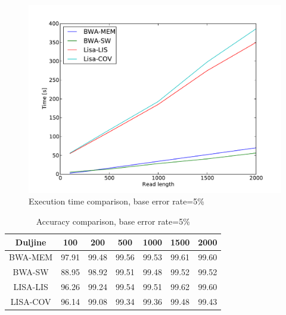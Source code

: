 \documentclass[times, utf8, diplomski]{fer}
\begin{document}
\begin{figure}[H]
\centering
\includegraphics[width=1.0\textwidth]{../img/chicken-e05-time.pdf}
\caption{Execution time comparison, base error rate=5\%}\label{chicken-e05-time}
\end{figure}

\begin{table}[H]
\centering
\begin{tabular}{|c||c|c|c|c|c|c|}
\hline
	Duljine & 100 & 200 & 500 & 1000 & 1500 & 2000\\
\hline
\hline
	BWA-MEM & 97.91 & 99.48 & 99.56 & 99.53 & 99.61 & 99.60\\
\hline
	BWA-SW  & 88.95 & 98.92 & 99.51 & 99.48 & 99.52 & 99.52\\
\hline
	LISA-LIS  & 96.26 & 99.24 & 99.54 & 99.51 & 99.62 & 99.60\\
\hline
	LISA-COV & 96.14 & 99.08 & 99.34 & 99.36 & 99.48 & 99.43\\
\hline
\end{tabular}
\caption{Accuracy comparison, base error rate=5\%}\label{chicken-e05-correct}
\end{table}
\end{document}
